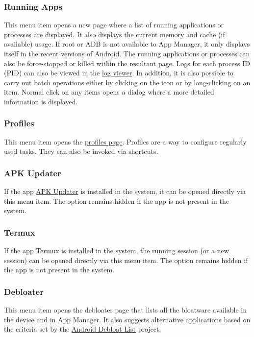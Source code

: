 \subsubsection{Running Apps}\label{subsubsec:main:running-apps} %
This menu item opens a new page where a list of running applications or processes are displayed. It also displays the
current memory and cache (if available) usage. If root or ADB is not available to App Manager, it only displays itself
in the recent versions of Android. The running applications or processes can also be force-stopped or killed within the
resultant page. Logs for each process ID (PID) can also be viewed in the \hyperref[subsubsec:main:labs]{log viewer}.
In addition, it is also possible to carry out batch operations either by clicking on the icon or by long-clicking on an
item. Normal click on any items opens a dialog where a more detailed information is displayed.

\subsubsection{Profiles} %
This menu item opens the \hyperref[sec:profiles-page]{profiles page}. Profiles are a way to configure regularly used
tasks. They can also be invoked via shortcuts.

\subsubsection{APK Updater} %
If the app \href{https://github.com/rumboalla/apkupdater}{APK Updater} is installed in the system, it can be opened
directly via this menu item. The option remains hidden if the app is not present in the system.

\subsubsection{Termux} %
If the app \href{https://github.com/termux/termux-app}{Termux} is installed in the system, the running session (or a
new session) can be opened directly via this menu item. The option remains hidden if the app is not present in the
system.

\subsubsection{Debloater} %
This menu item opens the debloater page that lists all the bloatware available in the device and in
App Manager. It also suggests alternative applications based on the criteria set by the \href{https://github.com/MuntashirAkon/android-debloat-list}{Android Debloat List}
project.


